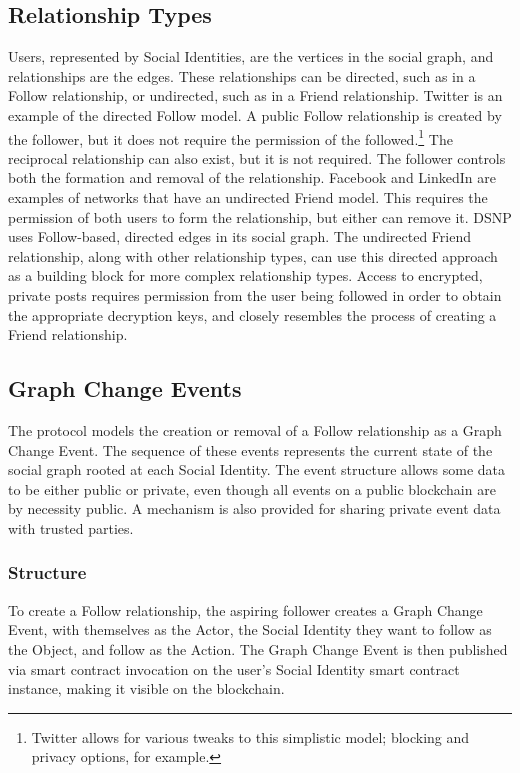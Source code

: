 \documentclass[12pt,letterpaper]{article}
\begin{document}
\subsection{Relationship Types}\label{sec:relationship_types}

Users, represented by Social Identities, are the vertices in the social graph, and
relationships are the edges. These relationships can be directed, such as in a Follow
relationship, or undirected, such as in a Friend relationship. Twitter is an example of
the directed Follow model. A public Follow relationship is created by the follower, but it
does not require the permission of the followed.\footnote{Twitter allows for various
	tweaks to this simplistic model; blocking and privacy options, for example.} The
reciprocal relationship can also exist, but it is not required. The follower controls both
the formation and removal of the relationship. Facebook and LinkedIn are examples of
networks that have an undirected Friend model. This requires the permission of both users
to form the relationship, but either can remove it. DSNP uses Follow-based, directed edges
in its social graph. The undirected Friend relationship, along with other relationship
types, can use this directed approach as a building block for more complex relationship
types. Access to encrypted, private posts requires permission from the user being followed
in order to obtain the appropriate decryption keys, and closely resembles the process of
creating a Friend relationship.

\subsection{Graph Change Events}\label{sec:graph_change_events}

The protocol models the creation or removal of a Follow relationship as a Graph Change
Event. The sequence of these events represents the current state of the social graph
rooted at each Social Identity. The event structure allows some data to be either public
or private, even though all events on a public blockchain are by necessity public. A
mechanism is also provided for sharing private event data with trusted parties.

\subsubsection{Structure}

To create a Follow relationship, the aspiring follower creates a Graph Change Event, with
themselves as the Actor, the Social Identity they want to follow as the Object, and follow
as the Action. The Graph Change Event is then published via smart contract invocation on
the user's Social Identity smart contract instance, making it visible on the blockchain.
\end{document}
